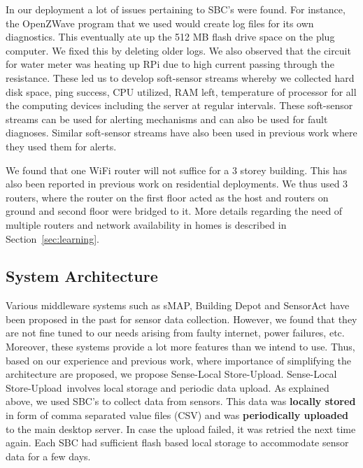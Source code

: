 \documentclass[10pt]{sensys-proc}
\newcommand{\secref}[1]{Section~\ref{#1}}
\newcommand{\paradigm}{Sense-Local Store-Upload}
\newcommand{\paradigms}{Sense-Local Store-Upload~}
\begin{document}
In our deployment a lot of issues pertaining to SBC's were found. For instance, the OpenZWave program that we used would create log files for its own diagnostics. This eventually ate up the 512 MB flash drive space on the plug computer. We fixed this by deleting older logs. We also observed that the circuit for water meter was heating up RPi due to high current passing through the resistance. These led us to develop soft-sensor streams whereby we collected hard disk space, ping success, CPU utilized, RAM left, temperature of processor for all the computing devices including the server at regular intervals. These soft-sensor streams can be used for alerting mechanisms and can also be used for fault diagnoses. Similar soft-sensor streams have also been used in previous work\cite{hitchhiker_residential} where they used them for alerts.

We found that one WiFi router will not suffice for a 3 storey building. This has also been reported in previous work on residential deployments\cite{hitchhiker_residential}. We thus used 3 routers, where the router on the first floor acted as the host and routers on ground and second floor were bridged to it. More details regarding the need of multiple routers and network availability in homes is described in \secref{sec:learning}.




\subsection{System Architecture}	
\label{sec:architecture}
Various middleware systems such as sMAP\cite{smap}, Building Depot\cite{buildingdepot} and SensorAct\cite{Arjunan12} have been proposed in the past for sensor data collection. However, we found that they are not fine tuned to our needs arising from faulty internet, power failures, etc. Moreover, these systems provide a lot more features than we intend to use. Thus, based on our experience and previous work\cite{hitchhiker_residential}, where importance of simplifying the architecture are proposed, we propose \paradigm. \paradigms involves local storage and periodic data upload. As explained above, we used SBC's to collect data from sensors. This data was \textbf{locally stored} in form of comma separated value files (CSV) and was \textbf{periodically uploaded} to the main desktop server. In case the upload failed, it was retried the next time again. Each SBC had sufficient flash based local storage to accommodate sensor data for a few days. 
\end{document}
